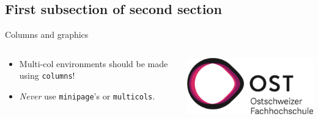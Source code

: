 \documentclass[aspectratio=169]{beamer}    %
\begin{document}
\subsection{First subsection of second section}
\begin{frame}{Columns and graphics}
    \begin{columns}[onlytextwidth]
        \begin{column}{0.5\textwidth}
            \begin{itemize}
                \item Multi-col environments should be made using \texttt{columns}!
                \item \emph{Never} use \texttt{minipage}'s or \texttt{multicols}.
            \end{itemize}
        \end{column}
        \begin{column}{0.5\textwidth}
            \centering
            \includegraphics[width=0.8\linewidth]{header/ost_logo}
        \end{column}
    \end{columns}
\end{frame}

%
\end{document}
